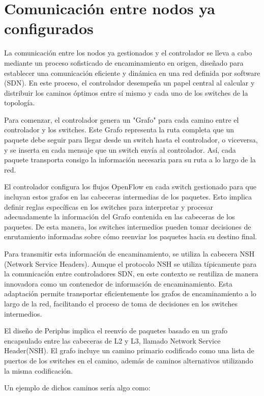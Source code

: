 \documentclass[a4paper, 12pt]{book}
\begin{document}
	\section{Comunicación entre nodos ya configurados}
	
	La comunicación entre los nodos ya gestionados y el controlador se lleva a cabo mediante un proceso sofisticado de encaminamiento en origen, diseñado para establecer una comunicación eficiente y dinámica en una red definida por software (SDN). En este proceso, el controlador desempeña un papel central al calcular y distribuir los caminos óptimos entre sí mismo y cada uno de los switches de la topología.
	
	Para comenzar, el controlador genera un "Grafo" para cada camino entre el controlador y los switches. Este Grafo representa la ruta completa que un paquete debe seguir para llegar desde un switch hasta el controlador, o viceversa, y se inserta en cada mensaje que un switch envía al controlador. Así, cada paquete transporta consigo la información necesaria para su ruta a lo largo de la red.
	
	El controlador configura los flujos OpenFlow en cada switch gestionado para que incluyan estos grafos en las cabeceras intermedias de los paquetes. Esto implica definir reglas específicas en los switches para interpretar y procesar adecuadamente la información del Grafo contenida en las cabeceras de los paquetes. De esta manera, los switches intermedios pueden tomar decisiones de enrutamiento informadas sobre cómo reenviar los paquetes hacia su destino final.
	
	Para transmitir esta información de encaminamiento, se utiliza la cabecera NSH (Network Service Headers). Aunque el protocolo NSH se utiliza típicamente para la comunicación entre controladores SDN, en este contexto se reutiliza de manera innovadora como un contenedor de información de encaminamiento. Esta adaptación permite transportar eficientemente los grafos de encaminamiento a lo largo de la red, facilitando el proceso de toma de decisiones en los switches intermedios.
	
	El diseño de Periplus implica el reenvío de paquetes basado en un grafo encapsulado entre las cabeceras de L2 y L3, llamado Network Service Header(NSH). El grafo incluye un camino primario codificado como una lista de puertos de los switches en el camino, además de caminos alternativos utilizando la misma codificación.
	
	Un ejemplo de dichos caminos sería algo como:
	
\end{document}
